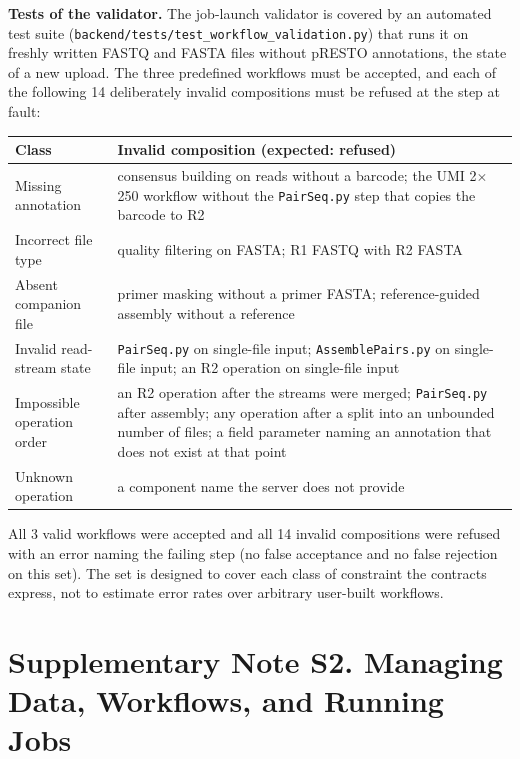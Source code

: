\documentclass[11pt]{article}
\begin{document}
\textbf{Tests of the validator.} The job-launch validator is covered by an
automated test suite (\texttt{backend/tests/test\_workflow\_validation.py})
that runs it on freshly written FASTQ and FASTA files without pRESTO
annotations, the state of a new upload. The three predefined workflows must be
accepted, and each of the following 14 deliberately invalid compositions must
be refused at the step at fault:
\begin{center}
\small
\begin{tabular}{p{}p{}}
\toprule
\textbf{Class} & \textbf{Invalid composition (expected: refused)} \\
\midrule
Missing annotation & consensus building on reads without a barcode; the UMI 2$\times$250 workflow without the \texttt{PairSeq.py} step that copies the barcode to R2 \\
Incorrect file type & quality filtering on FASTA; R1 FASTQ with R2 FASTA \\
Absent companion file & primer masking without a primer FASTA; reference-guided assembly without a reference \\
Invalid read-stream state & \texttt{PairSeq.py} on single-file input; \texttt{AssemblePairs.py} on single-file input; an R2 operation on single-file input \\
Impossible operation order & an R2 operation after the streams were merged; \texttt{PairSeq.py} after assembly; any operation after a split into an unbounded number of files; a field parameter naming an annotation that does not exist at that point \\
Unknown operation & a component name the server does not provide \\
\bottomrule
\end{tabular}
\end{center}
All 3 valid workflows were accepted and all 14 invalid compositions were
refused with an error naming the failing step (no false acceptance and no
false rejection on this set). The set is designed to cover each class of
constraint the contracts express, not to estimate error rates over arbitrary
user-built workflows.

\clearpage
\section*{Supplementary Note S2. Managing Data, Workflows, and Running Jobs}
\end{document}
